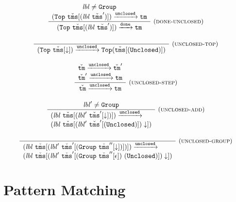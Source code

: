 \documentclass{article}
\newcommand{\rulename}{\textsc}
\newcommand{\irule}[3]{\frac{\begin{array}{c}#2\end{array}}{\begin{array}{l}#3\end{array}}{~\small\mbox{(\rulename{#1})}}}
\newcommand{\labelFont}{\texttt}
\newcommand{\lbl}{\ensuremath{\mathit{lbl}}}
\newcommand{\Top}{\ensuremath{\labelFont{Top}}}
\newcommand{\Group}{\ensuremath{\labelFont{Group}}}
\newcommand{\Unclosed}{\ensuremath{\labelFont{Unclosed}}}
\newcommand{\tm}{\ensuremath{\mathtt{tm}}}
\newcommand{\tms}{\ensuremath{\mathtt{tms}}}
\newcommand{\Tm}{\ensuremath{\check{\tm}}}
\newcommand{\Tms}{\ensuremath{\check{\tms}}}
\newcommand{\unclosed}{\ensuremath{\texttt{unclosed}}}
\newcommand{\done}{\ensuremath{\texttt{done}}}
\newcommand{\cursor}{\ensuremath{\downarrow}}
\newcommand{\steps}[1]{\ensuremath{\xrightarrow{#1}}}
\begin{document}
\[
  \begin{array}{c}
    \irule{done-unclosed}{
    \lbl \neq \Group\\
    (\Top~\Tms[(\lbl~\Tms')]) \steps{\unclosed} \tm\\
    }{
    (\Top~\Tms[(\lbl~\Tms')]) \steps{\done} \tm
    }
    \\\\
    \irule{unclosed-top}{}{
    (\Top~\Tms[\cursor]) \steps{\unclosed} \Top(\Tms[(\Unclosed)])
    }
    \\\\
    \irule{unclosed-step}{
    \Tm \steps{\unclosed} \Tm'\\
    \Tm' \steps{\unclosed} \tm
    }{
    \Tm \steps{\unclosed} \tm
    }
    \\\\
    \irule{unclosed-add}{
    \lbl' \neq \Group
    }{
    (\lbl~\Tms[(\lbl'~\Tms'[\cursor])]) \steps{\unclosed}\\
    (\lbl~\Tms[(\lbl'~\Tms'[(\Unclosed)]) \cursor])
    }
    \\\\
    \irule{unclosed-group}{}{
    (\lbl~\Tms[(\lbl'~\Tms'[(\Group~\Tms''[\cursor])])]) \steps{\unclosed}\\
    (\lbl~\Tms[(\lbl'~\Tms'[(\Group~\Tms''[\epsilon]) ~ (\Unclosed)]) \cursor])
    }
  \end{array}
\]

\section{Pattern Matching}
\end{document}
